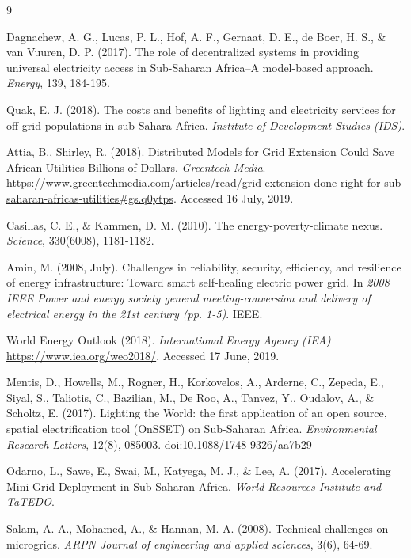 \documentclass[final,3p,times]{elsarticle}
\begin{document}
\begin{thebibliography}{9}

Dagnachew, A. G., Lucas, P. L., Hof, A. F., Gernaat, D. E., de Boer, H. S., \& van Vuuren, D. P. (2017). The role of decentralized systems in providing universal electricity access in Sub-Saharan Africa–A model-based approach. \textit{Energy}, 139, 184-195.

Quak, E. J. (2018). The costs and benefits of lighting and electricity services for off-grid populations in sub-Sahara Africa. \textit{Institute of Development Studies (IDS)}.

Attia, B., Shirley, R. (2018). Distributed Models for Grid Extension Could Save African Utilities Billions of Dollars. \textit{Greentech Media}. \url{https://www.greentechmedia.com/articles/read/grid-extension-done-right-for-sub-saharan-africas-utilities#gs.q0ytps}. Accessed 16 July, 2019.

Casillas, C. E., \& Kammen, D. M. (2010). The energy-poverty-climate nexus. \textit{Science}, 330(6008), 1181-1182.

Amin, M. (2008, July). Challenges in reliability, security, efficiency, and resilience of energy infrastructure: Toward smart self-healing electric power grid. In \textit{2008 IEEE Power and energy society general meeting-conversion and delivery of electrical energy in the 21st century (pp. 1-5)}. IEEE.

World Energy Outlook (2018). \textit{International Energy Agency (IEA)}
\url{https://www.iea.org/weo2018/}. Accessed 17 June, 2019.

Mentis, D., Howells, M., Rogner, H., Korkovelos, A., Arderne, C., Zepeda, E., Siyal, S., Taliotis, C., Bazilian, M., De Roo, A., Tanvez, Y., Oudalov, A., \& Scholtz, E. (2017). Lighting the World: the first application of an open source, spatial electrification tool (OnSSET) on Sub-Saharan Africa. \textit{Environmental Research Letters}, 12(8), 085003. doi:10.1088/1748-9326/aa7b29

Odarno, L., Sawe, E., Swai, M., Katyega, M. J., \& Lee, A. (2017). Accelerating Mini-Grid Deployment in Sub-Saharan Africa. \textit{World Resources Institute and TaTEDO}.

Salam, A. A., Mohamed, A., \& Hannan, M. A. (2008). Technical challenges on microgrids. \textit{ARPN Journal of engineering and applied sciences}, 3(6), 64-69.


\end{thebibliography}
\end{document}
